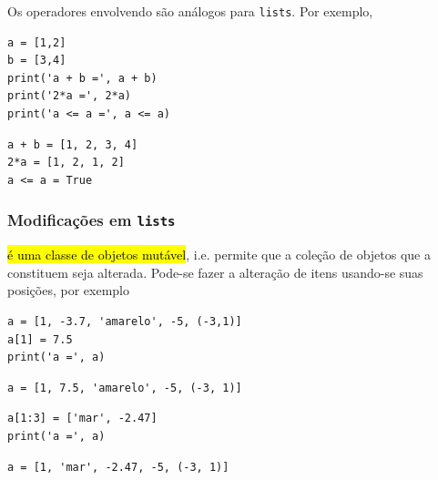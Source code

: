\begin{obs}[\hl{Operadores}]
  Os operadores envolvendo \texttt{\PYTHONtuple} são análogos para \texttt{lists}. Por exemplo,

\begin{lstlisting}
a = [1,2]
b = [3,4]
print('a + b =', a + b)
print('2*a =', 2*a)
print('a <= a =', a <= a)
\end{lstlisting}

\begin{verbatim}
a + b = [1, 2, 3, 4]
2*a = [1, 2, 1, 2]
a <= a = True  
\end{verbatim}

\end{obs}

\subsubsection{Modificações em \texttt{lists}}

\hl{{\PYTHONlist} é uma classe de objetos mutável}, i.e. permite que a coleção de objetos que a constituem seja alterada. Pode-se fazer a alteração de itens usando-se suas posições, por exemplo

\begin{lstlisting}
a = [1, -3.7, 'amarelo', -5, (-3,1)] 
a[1] = 7.5
print('a =', a)
\end{lstlisting}

\begin{verbatim}
a = [1, 7.5, 'amarelo', -5, (-3, 1)]
\end{verbatim}

\begin{lstlisting}
a[1:3] = ['mar', -2.47]
print('a =', a)
\end{lstlisting}

\begin{verbatim}
a = [1, 'mar', -2.47, -5, (-3, 1)]
\end{verbatim}

